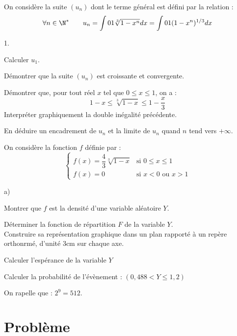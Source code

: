 \documentclass[11pt]{article}%
\begin{document}
On considère la suite $(u_{n})$ dont le terme général est défini par la
relation : 
\[
\forall n\in \N^{\ast }\qquad u_{n} = \dint{0}{1}\sqrt[3]{1-x^{n}}dx =
\dint{0}{1}(1-x^{n})^{1/3}dx
\]

\begin{noliste}{1.}
 \setlength{\itemsep}{4mm}
\item Calculer $u_{1}$.

\item Démontrer que la suite $(u_{n})$ est croissante et convergente.

\item Démontrer que, pour tout réel $x$ tel que $0\leq x\leq 1$,
on a : 
\[
1-x\leq \sqrt[3]{1-x}\leq 1-\dfrac{x}{3}
\]
Interpréter graphiquement la double inégalité précédente.

\item En déduire un encadrement de $u_{n}$ et la limite de $u_{n}$
quand $n$
tend vers $ + \infty $.

\item On considère la fonction $f$ définie par : 
\[
\left\{ 
\begin{array}{ll}
f(x) = \dfrac{4}{3}\sqrt[3]{1-x} & \text{si }0\leq x\leq 1 \\
f(x) = 0 & \text{si }x<0\text{ ou }x>1
\end{array}
\right.
\]

\begin{noliste}{a)}
 \setlength{\itemsep}{2mm}
\item Montrer que $f$ est la densité d'une variable aléatoire $Y$.

\item Déterminer la fonction de répartition $F$ de la variable $Y$.\\
Construire sa représentation graphique dans un plan rapporté à un
repère
orthonrmé, d'unité 3cm sur chaque axe.

\item Calculer l'espérance de la variable $Y$

\item Calculer la probabilité de l'évènement : $(0,488<Y\leq 1,2)$
\end{noliste}

On rapelle que : $2^{9} = 512$.
\end{noliste}

\section*{\textbf{Problème}}
\end{document}
